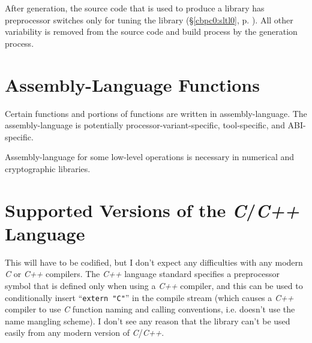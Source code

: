 After generation, the source code that is used to produce a 
library has preprocessor switches only for tuning the 
library (\S{}\ref{cbpc0:sltl0}, p.  \pageref{cbpc0:sltl0}).  
All other variability is removed from the source code and 
build process by the generation process.  


\section{Assembly-Language Functions}
\label{cldd0:salf0}

Certain \emph{\productbasenameshort{}} functions and 
portions of functions are written in assembly-language.  The 
assembly-language is potentially 
pro\-ces\-sor-var\-i\-ant-spe\-cif\-ic, tool-spe\-cif\-ic, 
and ABI-spe\-cif\-ic.  

Assembly-language for some low-level operations is necessary 
in numerical and cryptographic libraries.  


\section{Supported Versions of the \emph{C}/\emph{C++} Language}
\label{cldd0:sscv0}

This will have to be codified, but I don't expect any 
difficulties with any modern \emph{C} or \emph{C++} 
compilers.  The \emph{C++} language standard specifies a 
preprocessor symbol that is defined only when using a 
\emph{C++} compiler, and this can be used to conditionally 
insert ``\texttt{extern "C"}'' in the compile stream (which 
causes a \emph{C++} compiler to use \emph{C} function naming 
and calling conventions, i.e.  doesn't use the name mangling 
scheme).  I don't see any reason that the library can't be 
used easily from any modern version of \emph{C}/\emph{C++}.  


